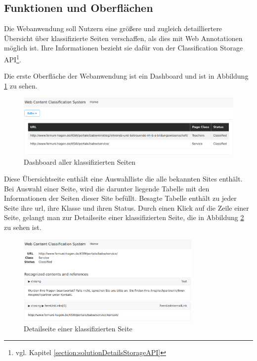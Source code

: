 \subsection{Funktionen und Oberflächen}
    Die Webanwendung soll Nutzern eine größere und zugleich detailliertere
    Übersicht über klassifizierte Seiten verschaffen,
    als dies mit Web Annotationen möglich ist.
    Ihre Informationen bezieht sie dafür von der
    Classification Storage API\footnote{vgl. Kapitel \ref{section:solutionDetailsStorageAPI}}.

    Die erste Oberfläche der Webanwendung ist ein Dashboard
    und ist in Abbildung \ref{image:webAppDashboard} zu sehen.

    \begin{figure}[htb]
        \centering
        \includegraphics[width=\textwidth]{../resources/web-app/dashboard.png}
        \caption{Dashboard aller klassifizierten Seiten}
        \label{image:webAppDashboard}
    \end{figure}

    Diese Übersichtseite enthält eine Auswahlliste die alle bekannten Sites enthält.
    Bei Auswahl einer Seite, wird die darunter liegende Tabelle mit den Informationen
    der Seiten dieser Site befüllt.
    Besagte Tabelle enthält zu jeder Seite ihre \gls{url}, ihre Klasse und ihren Status.
    Durch einen Klick auf die Zeile einer Seite,
    gelangt man zur Detailseite einer klassifizierten Seite,
    die in Abbildung \ref{image:webAppDetailPage} zu sehen ist.

    \begin{figure}[htb]
        \centering
        \includegraphics[width=0.8\textwidth]{../resources/web-app/detail-page.png}
        \caption{Detailseite einer klassifizierten Seite}
        \label{image:webAppDetailPage}
    \end{figure}

